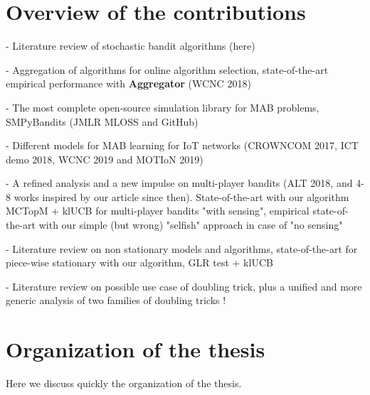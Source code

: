 \section{Overview of the contributions}
\label{sec:1:contributions}


- Literature review of stochastic bandit algorithms (here)

- Aggregation of algorithms for online algorithm selection, state-of-the-art empirical performance with \textbf{Aggregator} (WCNC 2018)

- The most complete open-source simulation library for MAB problems, SMPyBandits (JMLR MLOSS and GitHub)

- Different models for MAB learning for IoT networks (CROWNCOM 2017, ICT demo 2018, WCNC 2019 and MOTIoN 2019)

- A refined analysis and a new impulse on multi-player bandits (ALT 2018, and 4-8 works inspired by our article since then). State-of-the-art with our algorithm MCTopM + klUCB for multi-player bandits "with sensing", empirical state-of-the-art with our simple (but wrong) "selfish" approach in case of "no sensing"

- Literature review on non stationary models and algorithms, state-of-the-art for piece-wise stationary with our algorithm, GLR test + klUCB

- Literature review on possible use case of doubling trick, plus a unified and more generic analysis of two families of doubling tricks !


\section{Organization of the thesis}
\label{sec:1:organization}

Here we discuss quickly the organization of the thesis.

